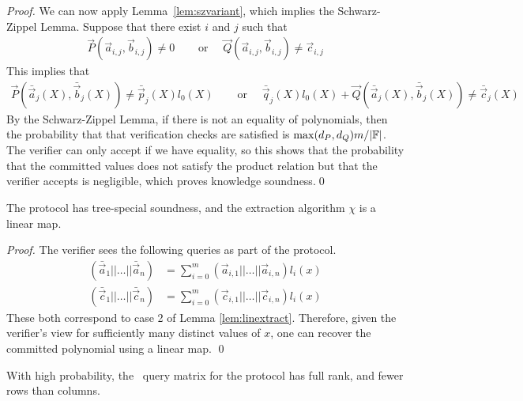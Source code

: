 \begin{proof}
We can now apply Lemma~\ref{lem:szvariant}, which implies the Schwarz-Zippel Lemma. Suppose that there exist $i$ and $j$ such that
\begin{align*}
\vec{P}(\vec{a}_{i,j},\vec{b}_{i,j}) \neq 0 & \quad \text{ or } \quad \vec{Q}(\vec{a}_{i,j},\vec{b}_{i,j}) \neq \vec{c}_{i,j}
\end{align*}
This implies that
\begin{align*}
\vec{P}(\bar{\vec{a}}_j(X),\bar{\vec{b}}_j(X)) \neq \bar{\vec{p}}_j(X)l_0(X) & \quad \text{ or } \quad \bar{\vec{q}}_j(X)l_0(X)+\vec{Q}(\bar{\vec{a}}_j(X),\bar{\vec{b}}_j(X)) \neq \bar{\vec{c}}_j(X)
\end{align*}
By the Schwarz-Zippel Lemma, if there is not an equality of polynomials, then the probability that that verification checks are satisfied is $\max (d_P,d_Q) m / |\mathbb{F}|$. The verifier can only accept if we have equality, so this shows that the probability that the committed values does not satisfy the product relation but that the verifier accepts is negligible, which proves knowledge soundness.\qed
\end{proof}

\begin{lemma}
The protocol has tree-special soundness, and the extraction algorithm $\chi$ is a linear map.
\end{lemma}

\begin{proof}
The verifier sees the following queries as part of the protocol.
\begin{align*}
(\bar{\vec{a}}_1||\ldots||\bar{\vec{a}}_n) &= \sum_{i=0}^m ( \vec{a}_{i,1}||\ldots||\vec{a}_{i,n}) {l_i(x)} \\
(\bar{\vec{c}}_1||\ldots||\bar{\vec{c}}_n) &= \sum_{i=0}^m ( \vec{c}_{i,1}||\ldots||\vec{c}_{i,n}) {l_i(x)}
\end{align*}
These both correspond to case 2 of Lemma \ref{lem:linextract}. Therefore, given the verifier's view for sufficiently many distinct values of $x$, one can recover the committed polynomial using a linear map. \qed
\end{proof}

\begin{lemma}
With high probability, the \ILC\ query matrix for the protocol has full rank, and fewer rows than columns.
\end{lemma}

